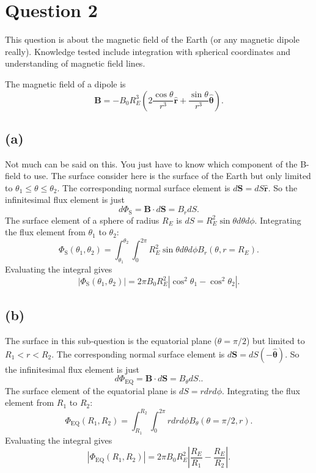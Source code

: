 \documentclass[a4paper]{article}
\begin{document}
\section*{Question 2}
This question is about the magnetic field of the Earth (or any magnetic dipole really). Knowledge tested include integration with spherical coordinates and understanding of magnetic field lines.

The magnetic field of a dipole is 
 \[
     \bm{B} = - B_0 R_E^3 \left( 2 \frac{\cos\theta}{r^3} \mathbf{\hat{r}} + \frac{\sin\theta}{r^3} \hat{\bm{\theta}} \right) 
.\] 
\subsection*{(a)}
Not much can be said on this. You just have to know which component of the B-field to use. 
The surface consider here is the surface of the Earth but only limited to $\theta_1 \leq \theta \leq \theta_2$. The corresponding normal surface element is $d \bm{S} = dS \bm{\hat{r}}$. So the infinitesimal flux element is just 
\[
d\Phi_\text{S} = \bm{B} \cdot d \bm{S} = B_r dS 
.\] 
The surface element of a sphere of radius $R_E$ is $dS = R_E^2 \sin\theta d\theta d\phi$. Integrating the flux element from $\theta_1$ to $\theta_2$:
 \[
     \Phi_\text{S}(\theta_1, \theta_2) = \int_{\theta_1}^{\theta_2} \int_0^{2\pi} R_E^2 \sin\theta d\theta d\phi B_r(\theta, r=R_E) 
.\]
Evaluating the integral gives
\[
    |\Phi_\text{S}(\theta_1, \theta_2)| = 2 \pi B_0 R_E^2 \left| \cos^2\theta_1 - \cos^2\theta_2 \right| 
.\] 
\subsection*{(b)}
The surface in this sub-question is the equatorial plane ($\theta=\pi/2$) but limited to  $R_1 < r < R_2$. The corresponding normal surface element is $d \bm{S} = d S (-\hat{\bm{\theta}})$. So the infinitesimal flux element is just 
\[
d\Phi_\text{EQ} = \bm{B} \cdot d \bm{S} = B_\theta dS.
.\] 
The surface element of the equatorial plane is $dS = r dr d\phi$. Integrating the flux element from  $R_1$ to $R_2$:
\[
    \Phi_\text{EQ}(R_1, R_2) = \int_{R_1}^{R_2} \int_0^{2 \pi} r dr d\phi B_\theta(\theta=\pi/2, r)
.\]
Evaluating the integral gives
\[
\left|\Phi_\text{EQ}(R_1, R_2)\right| = 2 \pi B_0 R_E^2 \left| \frac{R_E}{R_1} - \frac{R_E}{R_2}\right|
.\] 
\end{document}
